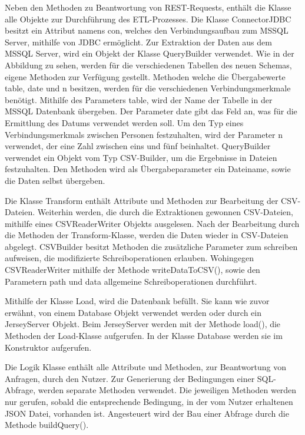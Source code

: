 Neben den Methoden zu Beantwortung von REST-Requests, enthält die Klasse alle Objekte zur Durchführung des ETL-Prozesses. Die Klasse ConnectorJDBC besitzt ein Attribut namens con, welches den Verbindungsaufbau zum MSSQL Server, mithilfe von JDBC ermöglicht. Zur Extraktion der Daten aus dem MSSQL Server, wird ein Objekt der Klasse QueryBuilder verwendet. Wie in der Abbildung zu sehen, werden für die verschiedenen Tabellen des neuen Schemas, eigene Methoden zur Verfügung gestellt. Methoden welche die Übergabewerte table, date und n besitzen, werden für die verschiedenen Verbindungsmerkmale benötigt. Mithilfe des Parameters table, wird der Name der Tabelle in der MSSQL Datenbank übergeben. Der Parameter date gibt das Feld an, was für die Ermittlung des Datums verwendet werden soll. Um den Typ eines Verbindungsmerkmals zwischen Personen festzuhalten, wird der Parameter n verwendet, der eine Zahl zwischen eins und fünf beinhaltet. QueryBuilder verwendet ein Objekt vom Typ CSV-Builder, um die Ergebnisse in Dateien festzuhalten. Den Methoden wird als Übergabeparameter ein Dateiname, sowie die Daten selbst übergeben.

Die Klasse Transform enthält Attribute und Methoden zur Bearbeitung der CSV-Dateien. Weiterhin werden, die durch die Extraktionen gewonnen CSV-Dateien, mithilfe eines CSVReaderWriter Objekts ausgelesen. Nach der Bearbeitung durch die Methoden der Transform-Klasse, werden die Daten wieder in CSV-Dateien abgelegt. CSVBuilder besitzt Methoden die zusätzliche Parameter zum schreiben aufweisen, die modifizierte Schreiboperationen erlauben. Wohingegen CSVReaderWriter mithilfe der Methode writeDataToCSV(), sowie den Parametern path und data allgemeine Schreiboperationen durchführt.

Mithilfe der Klasse Load, wird die Datenbank befüllt. Sie kann wie zuvor erwähnt, von einem Database Objekt verwendet werden oder durch ein JerseyServer Objekt. Beim JerseyServer werden mit der Methode load(), die Methoden der Load-Klasse aufgerufen. In der Klasse Database werden sie im Konstruktor aufgerufen. 

Die Logik Klasse enthält alle Attribute und Methoden, zur Beantwortung von Anfragen, durch den Nutzer. Zur Generierung der Bedingungen einer SQL-Abfrage, werden separate Methoden verwendet. Die jeweiligen Methoden werden nur gerufen, sobald die entsprechende Bedingung, in der vom Nutzer erhaltenen JSON Datei, vorhanden ist. Angesteuert wird der Bau einer Abfrage durch die Methode buildQuery(). 

